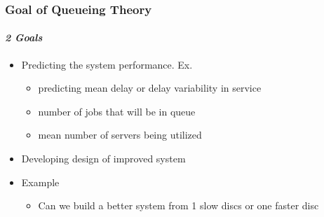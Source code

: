 \documentclass{beamer}
\begin{document}
\begin{frame}
    \frametitle{Goal of Queueing Theory}
    \framesubtitle{\textbf{\textit{2 Goals}}}
	\begin{itemize}
		\item Predicting the system performance. Ex. 
		\begin{itemize}
			\item predicting mean delay or delay variability in service   
			\item number of jobs that will be in queue 
			\item mean number of servers being utilized
			\end{itemize}
		\item Developing design of improved system
		\item Example
			\begin{itemize}
			\item Can we build a better system from 1 slow discs or one faster 						disc
			\end{itemize}
	\end{itemize}	    
    
\end{frame}
\end{document}
